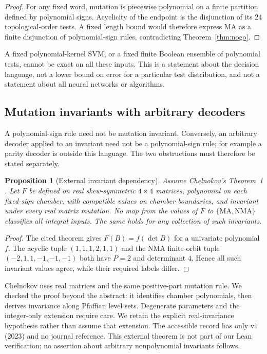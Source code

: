 \documentclass[11pt]{amsart}
\newtheorem{proposition}[theorem]{Proposition}
\theoremstyle{definition}\newtheorem{definition}[theorem]{Definition}
\theoremstyle{remark}\newtheorem{remark}[theorem]{Remark}
\newcommand{\MA}{\mathrm{MA}}\newcommand{\NMA}{\mathrm{NMA}}
\begin{document}
\begin{proof}
For any fixed word, mutation is piecewise polynomial on a finite partition defined by polynomial signs. Acyclicity of the endpoint is the disjunction of its $24$ topological-order tests. A fixed length bound would therefore express MA as a finite disjunction of polynomial-sign rules, contradicting Theorem~\ref{thm:nogo}.
\end{proof}
A fixed polynomial-kernel SVM, or a fixed finite Boolean ensemble of polynomial tests, cannot be exact on all these inputs. This is a statement about the decision language, not a lower bound on error for a particular test distribution, and not a statement about all neural networks or algorithms.

\subsection{Mutation invariants with arbitrary decoders}\label{sec:invariants}
A polynomial-sign rule need not be mutation invariant. Conversely, an arbitrary decoder applied to an invariant need not be a polynomial-sign rule; for example a parity decoder is outside this language. The two obstructions must therefore be stated separately.

\begin{proposition}[External invariant dependency]\label{prop:invariant}
Assume Chelnokov's Theorem~1 \cite{Chelnokov}. Let $F$ be defined on real skew-symmetric $4\times4$ matrices, polynomial on each fixed-sign chamber, with compatible values on chamber boundaries, and invariant under every real matrix mutation. No map from the values of $F$ to $\{\MA,\NMA\}$ classifies all integral inputs. The same holds for any collection of such invariants.
\end{proposition}
\begin{proof}
The cited theorem gives $F(B)=f(\det B)$ for a univariate polynomial $f$. The acyclic tuple $(1,1,1,2,1,1)$ and the NMA finite-orbit tuple $(-2,1,1,-1,-1,-1)$ both have $P=2$ and determinant $4$. Hence all such invariant values agree, while their required labels differ.
\end{proof}
Chelnokov uses real matrices and the same positive-part mutation rule. We checked the proof beyond the abstract: it identifies chamber polynomials, then derives invariance along Pfaffian level sets. Degenerate parameters and the integer-only extension require care. We retain the explicit real-invariance hypothesis rather than assume that extension. The accessible record has only v1 (2023) and no journal reference. This external theorem is not part of our Lean verification; no assertion about arbitrary nonpolynomial invariants follows.
\end{document}
